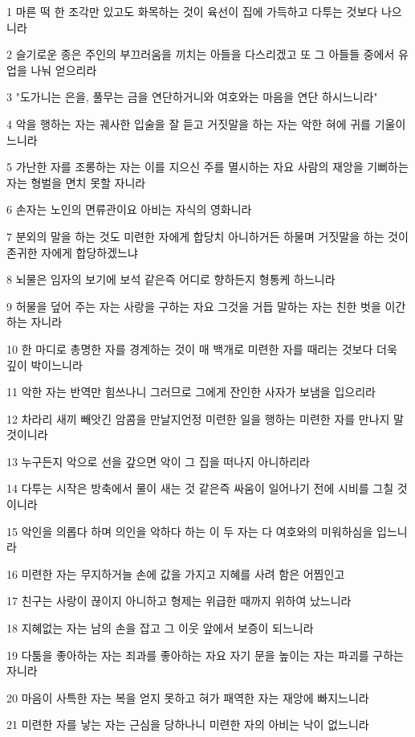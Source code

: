 \par 1 마른 떡 한 조각만 있고도 화목하는 것이 육선이 집에 가득하고 다투는 것보다 나으니라
\par 2 슬기로운 종은 주인의 부끄러움을 끼치는 아들을 다스리겠고 또 그 아들들 중에서 유업을 나눠 얻으리라
\par 3 "도가니는 은을, 풀무는 금을 연단하거니와 여호와는 마음을 연단 하시느니라"
\par 4 악을 행하는 자는 궤사한 입술을 잘 듣고 거짓말을 하는 자는 악한 혀에 귀를 기울이느니라
\par 5 가난한 자를 조롱하는 자는 이를 지으신 주를 멸시하는 자요 사람의 재앙을 기뻐하는 자는 형벌을 면치 못할 자니라
\par 6 손자는 노인의 면류관이요 아비는 자식의 영화니라
\par 7 분외의 말을 하는 것도 미련한 자에게 합당치 아니하거든 하물며 거짓말을 하는 것이 존귀한 자에게 합당하겠느냐
\par 8 뇌물은 임자의 보기에 보석 같은즉 어디로 향하든지 형통케 하느니라
\par 9 허물을 덮어 주는 자는 사랑을 구하는 자요 그것을 거듭 말하는 자는 친한 벗을 이간하는 자니라
\par 10 한 마디로 총명한 자를 경계하는 것이 매 백개로 미련한 자를 때리는 것보다 더욱 깊이 박이느니라
\par 11 악한 자는 반역만 힘쓰나니 그러므로 그에게 잔인한 사자가 보냄을 입으리라
\par 12 차라리 새끼 빼앗긴 암콤을 만날지언정 미련한 일을 행하는 미련한 자를 만나지 말 것이니라
\par 13 누구든지 악으로 선을 갚으면 악이 그 집을 떠나지 아니하리라
\par 14 다투는 시작은 방축에서 물이 새는 것 같은즉 싸움이 일어나기 전에 시비를 그칠 것이니라
\par 15 악인을 의롭다 하며 의인을 악하다 하는 이 두 자는 다 여호와의 미워하심을 입느니라
\par 16 미련한 자는 무지하거늘 손에 값을 가지고 지혜를 사려 함은 어찜인고
\par 17 친구는 사랑이 끊이지 아니하고 형제는 위급한 때까지 위하여 났느니라
\par 18 지혜없는 자는 남의 손을 잡고 그 이웃 앞에서 보증이 되느니라
\par 19 다툼을 좋아하는 자는 죄과를 좋아하는 자요 자기 문을 높이는 자는 파괴를 구하는 자니라
\par 20 마음이 사특한 자는 복을 얻지 못하고 혀가 패역한 자는 재앙에 빠지느니라
\par 21 미련한 자를 낳는 자는 근심을 당하나니 미련한 자의 아비는 낙이 없느니라
